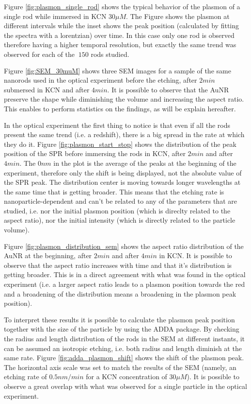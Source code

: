\documentclass[twocolumn]{article}
\begin{document}
Figure \ref{fig:plasmon_single_rod} shows the typical behavior of the plasmon of
a single rod while immersed in KCN $30\mu M$. The Figure shows the plasmon at
different intervals while the inset shows the peak position (calculated by
fitting the spectra with a lorentzian) over time. In this case only one rod is
observed therefore having a higher temporal resolution, but exactly the same
trend was observed for each of the $~150$ rods studied.


Figure \ref{fig:SEM_30muM} shows three SEM images for a sample of the same
nanorods used in the optical experiment before the etching, after $2min$
submersed in KCN and after $4min$. It is possible to observe that the AuNR
preserve the shape while diminishing the volume and increasing the aspect ratio.
This enables to perform statistics on the findings, as will be explain
hereafter. 

In the optical experiment the first thing to notice is that even if all the rods
present the same trend (i.e. a redshift), there is a big spread in the rate at
which they do it. Figure \ref{fig:plasmon_start_stop} shows the distribution of
the peak position of the SPR before immersing the rods in KCN, after $2min$ and
after $4min$. The $0nm$ in the plot is the average of the peaks at the
beginning of the experiment, therefore only the shift is being displayed, not
the absolute value of the SPR peak. The distribution center is moving towards
longer wavelengths at the same time that is getting broader. This means that
the etching rate is nanoparticle-dependent and can't be related to any of the
parameters that are studied, i.e. nor the initial plasmon position (which
is direclty related to the aspect ratio), nor the initial intensity (which is
directly related to the particle volume). 

Figure \ref{fig:plasmon_distribution_sem} shows the aspect ratio distribution of
the AuNR at the beginning, after $2min$ and after $4min$ in KCN. It is possible
to observe that the aspect ratio increases with time and that it's distribution
is getting broader. This is in a direct agreement with what was found in the
optical experiment (i.e. a larger aspect ratio leads to a plasmon position
towards the red and a broadening of the distribution means a broadening in the
plasmon peak position). 

To interpret these results it is possible to calculate the plasmon peak position
together with the size of the particle by using the ADDA package. By checking
the radius and length distribution of the rods in the SEM at different instants, 
it can be assumed an isotropic etching, i.e. both radius and length diminish at
the same rate. Figure \ref{fig:adda_plasmon_shift} shows the shift of the
plasmon peak. The horizontal axis scale was set to match the results of the SEM
(namely, an etching rate of $0.5nm/min$ for a KCN concentration of $30\mu M$).
It is possible to observe a great overlap with what was observed for a single
particle in the optical experiment. 
\end{document}
